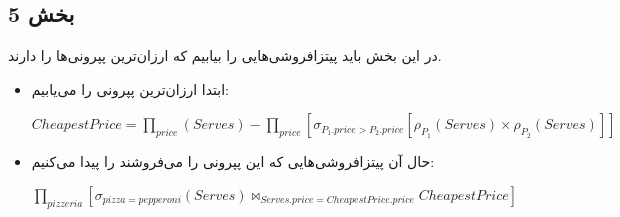 \subsection*{بخش 5}
در این بخش باید پیتزافروشی‌هایی را بیابیم که ارزان‌ترین پپرونی‌ها را دارند.
\begin{itemize}
	\item ابتدا ارزان‌ترین پپرونی را می‌یابیم:
	
	\setLTR
	$CheapestPrice = \prod_{price}(Serves) - \prod_{price}[\sigma_{P_1.price>P_2.price}[\rho_{P_1}(Serves)\times\rho_{P_2}(Serves)]]$
	\setRTL
	
	\item حال آن پیتزافروشی‌هایی که این پپرونی را می‌فروشند را پیدا می‌کنیم:
	
	\setLTR
	
	$\prod_{pizzeria}[\sigma_{pizza=pepperoni}(Serves)\bowtie_{Serves.price = CheapestPrice.price}CheapestPrice]$
	\setRTL
\end{itemize}